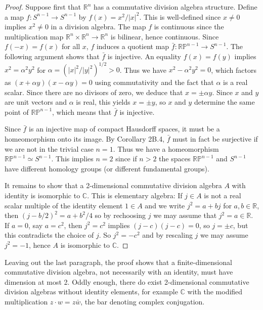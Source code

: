 \begin{proof}
 Suppose first that $\mathbb{R}^n$ has a commutative division algebra structure. Define a map $f: S^{n-1} \to S^{n-1}$ by $f(x) = x^2/|x|^2$. This is well-defined since $x \neq 0$ implies $x^2 \neq 0$ in a division algebra. The map $f$ is continuous since the multiplication map $\mathbb{R}^n \times \mathbb{R}^n \to \mathbb{R}^n$ is bilinear, hence continuous. Since $f(-x) = f(x)$ for all $x$, $f$ induces a quotient map $\bar{f}: \mathbb{RP}^{n-1} \to S^{n-1}$. The following argument shows that $\bar{f}$ is injective. An equality $f(x) = f(y)$ implies $x^2 = \alpha^2 y^2$ for $\alpha = (|x|^2/|y|^2)^{1/2} > 0$. Thus we have $x^2 - \alpha^2 y^2 = 0$, which factors as $(x + \alpha y)(x - \alpha y) = 0$ using commutativity and the fact that $\alpha$ is a real scalar. Since there are no divisors of zero, we deduce that $x = \pm \alpha y$. Since $x$ and $y$ are unit vectors and $\alpha$ is real, this yields $x = \pm y$, so $x$ and $y$ determine the same point of $\mathbb{RP}^{n-1}$, which means that $\bar{f}$ is injective.

Since $\bar{f}$ is an injective map of compact Hausdorff spaces, it must be a homeomorphism onto its image. By Corollary 2B.4, $\bar{f}$ must in fact be surjective if we are not in the trivial case $n = 1$. Thus we have a homeomorphism $\mathbb{RP}^{n-1} \simeq S^{n-1}$. This implies $n = 2$ since if $n > 2$ the spaces $\mathbb{RP}^{n-1}$ and $S^{n-1}$ have different homology groups (or different fundamental groups).

It remains to show that a 2-dimensional commutative division algebra $A$ with identity is isomorphic to $\mathbb{C}$. This is elementary algebra: If $j \in A$ is not a real scalar multiple of the identity element $1 \in A$ and we write $j^2 = a + bj$ for $a, b \in \mathbb{R}$, then $(j - b/2)^2 = a + b^2/4$ so by rechoosing $j$ we may assume that $j^2 = a \in \mathbb{R}$. If $a = 0$, say $a = c^2$, then $j^2 = c^2$ implies $(j-c)(j-c) = 0$, so $j = \pm c$, but this contradicts the choice of $j$. So $j^2 = -c^2$ and by rescaling $j$ we may assume $j^2 = -1$, hence $A$ is isomorphic to $\mathbb{C}$.
\end{proof}
Leaving out the last paragraph, the proof shows that a finite-dimensional commutative division algebra, not necessarily with an identity, must have dimension at most 2. Oddly enough, there do exist 2-dimensional commutative division algebras without identity elements, for example $\mathbb{C}$ with the modified multiplication $z \cdot w = z\bar{w}$, the bar denoting complex conjugation.

